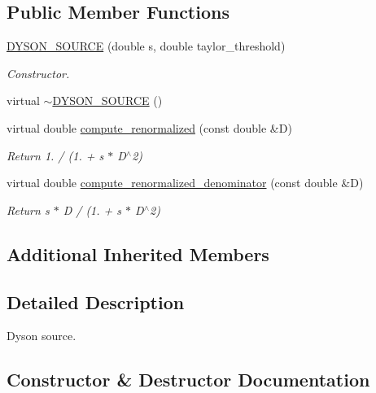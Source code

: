 \subsection*{Public Member Functions}
\begin{DoxyCompactItemize}
\item 
\mbox{\hyperlink{classforte_1_1_d_y_s_o_n___s_o_u_r_c_e_ab2324ffbc215ccba3e95b480d55ea458}{D\+Y\+S\+O\+N\+\_\+\+S\+O\+U\+R\+CE}} (double s, double taylor\+\_\+threshold)
\begin{DoxyCompactList}\small\item\em Constructor. \end{DoxyCompactList}\item 
virtual \mbox{\hyperlink{classforte_1_1_d_y_s_o_n___s_o_u_r_c_e_abf100069942a8596a34452680b1f2af5}{$\sim$\+D\+Y\+S\+O\+N\+\_\+\+S\+O\+U\+R\+CE}} ()
\item 
virtual double \mbox{\hyperlink{classforte_1_1_d_y_s_o_n___s_o_u_r_c_e_a27ff5faaabaa609facbce558d126cc96}{compute\+\_\+renormalized}} (const double \&D)
\begin{DoxyCompactList}\small\item\em Return 1. / (1. + s $\ast$ D$^\wedge$2) \end{DoxyCompactList}\item 
virtual double \mbox{\hyperlink{classforte_1_1_d_y_s_o_n___s_o_u_r_c_e_a2da089db945ae849b5d733493a5b8d39}{compute\+\_\+renormalized\+\_\+denominator}} (const double \&D)
\begin{DoxyCompactList}\small\item\em Return s $\ast$ D / (1. + s $\ast$ D$^\wedge$2) \end{DoxyCompactList}\end{DoxyCompactItemize}
\subsection*{Additional Inherited Members}


\subsection{Detailed Description}
Dyson source. 

\subsection{Constructor \& Destructor Documentation}
\mbox{\label{classforte_1_1_d_y_s_o_n___s_o_u_r_c_e_ab2324ffbc215ccba3e95b480d55ea458}} 
